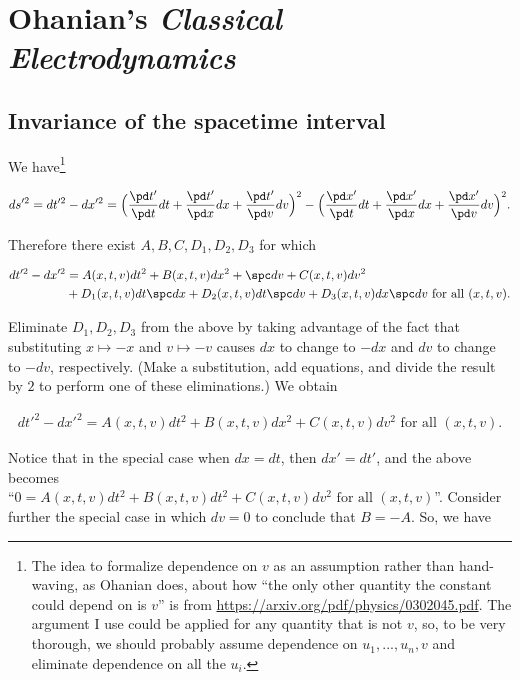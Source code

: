 \section*{Ohanian's \textit{Classical Electrodynamics}}

\subsection*{Invariance of the spacetime interval}

We have\footnote{The idea to formalize dependence on $v$ as an assumption rather than hand-waving, as Ohanian does, about how ``the only other quantity the constant could depend on is $v$'' is from \url{https://arxiv.org/pdf/physics/0302045.pdf}. The argument I use could be applied for any quantity that is not $v$, so, to be very thorough, we should probably assume dependence on $u_1, ..., u_n, v$ and eliminate dependence on all the $u_i$.}

\begin{align*}
	ds'^2 = dt'^2 - dx'^2 = \Big( \frac{\pd t'}{\pd t} dt + \frac{\pd t'}{\pd x} dx + \frac{\pd t'}{\pd v} dv \Big)^2 - \Big( \frac{\pd x'}{\pd t} dt + \frac{\pd x'}{\pd x} dx + \frac{\pd x'}{\pd v} dv \Big)^2.
\end{align*}

Therefore there exist $A, B, C, D_1, D_2, D_3$ for which

\begin{align*}
	dt'^2 - dx'^2 &= A(x, t, v) dt^2 + B(x, t, v) dx^2 + \spc dv + C(x, t, v) dv^2 \\
	&+ D_1(x, t, v) dt \spc dx + D_2(x, t, v) dt \spc dv + D_3(x, t, v) dx \spc dv
	\text{ for all $(x, t, v)$}.
\end{align*}

Eliminate $D_1, D_2, D_3$ from the above by taking advantage of the fact that substituting $x \mapsto -x$ and $v \mapsto -v$ causes $dx$ to change to $-dx$ and $dv$ to change to $-dv$, respectively. (Make a substitution, add equations, and divide the result by $2$ to perform one of these eliminations.) We obtain

\begin{align*}
	dt'^2 - dx'^2 = A(x, t, v) dt^2 + B(x, t, v) dx^2 + C(x, t, v) dv^2 \text{ for all $(x, t, v)$}.
\end{align*}

Notice that in the special case when $dx = dt$, then $dx' = dt'$, and the above becomes \\ ``$0 = A(x, t, v) dt^2 + B(x, t, v) dt^2 + C(x, t, v) dv^2 \text{ for all $(x, t, v)$}$''. Consider further the special case in which $dv = 0$ to conclude that $B = - A$. So, we have


